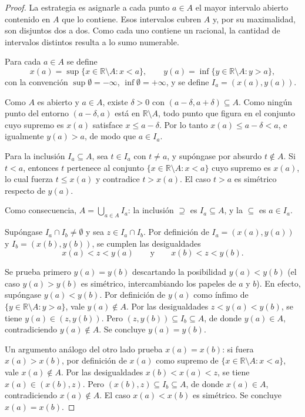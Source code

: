 \documentclass[11pt, a4paper]{article}
\begin{document}
\begin{proof}
La estrategia es asignarle a cada punto $a \in A$ el mayor intervalo abierto contenido en $A$ que
lo contiene. Esos intervalos cubren $A$ y, por su maximalidad, son disjuntos dos a dos. Como cada
uno contiene un racional, la cantidad de intervalos distintos resulta a lo sumo numerable.

Para cada $a \in A$ se define
$$ x(a) = \sup\{x \in \mathbb{R} \setminus A : x < a\}, \qquad y(a) = \inf\{y \in \mathbb{R}
\setminus A : y > a\}, $$
con la convención $\sup \emptyset = -\infty$, $\inf \emptyset = +\infty$, y se define
$I_a = (x(a), y(a))$.

Como $A$ es abierto y $a \in A$, existe $\delta > 0$ con
$(a - \delta, a + \delta) \subseteq A$. Como ningún punto del entorno $(a - \delta, a)$ está en
$\mathbb{R} \setminus A$, todo punto que figura en el conjunto cuyo supremo es $x(a)$ satisface
$x \le a - \delta$. Por lo tanto $x(a) \le a - \delta < a$, e igualmente $y(a) > a$, de modo que
$a \in I_a$.

Para la inclusión $I_a \subseteq A$, sea $t \in I_a$ con $t \ne a$, y supóngase por absurdo
$t \notin A$. Si $t < a$, entonces $t$ pertenece al conjunto $\{x \in \mathbb{R} \setminus A :
x < a\}$ cuyo supremo es $x(a)$, lo cual fuerza $t \le x(a)$ y contradice $t > x(a)$. El caso
$t > a$ es simétrico respecto de $y(a)$.

Como consecuencia, $A = \bigcup_{a \in A} I_a$: la inclusión $\supseteq$ es $I_a \subseteq A$, y
la $\subseteq$ es $a \in I_a$.

Supóngase $I_a \cap I_b \ne \emptyset$ y sea $z \in I_a \cap I_b$. Por definición de
$I_a = (x(a), y(a))$ y $I_b = (x(b), y(b))$, se cumplen las desigualdades
$$ x(a) < z < y(a) \qquad \text{y} \qquad x(b) < z < y(b). $$

Se prueba primero $y(a) = y(b)$ descartando la posibilidad $y(a) < y(b)$ (el caso $y(a) > y(b)$
es simétrico, intercambiando los papeles de $a$ y $b$). En efecto, supóngase $y(a) < y(b)$. Por
definición de $y(a)$ como ínfimo de $\{y \in \mathbb{R} \setminus A : y > a\}$, vale
$y(a) \notin A$. Por las desigualdades $z < y(a) < y(b)$, se tiene $y(a) \in (z, y(b))$. Pero
$(z, y(b)) \subseteq I_b \subseteq A$, de donde $y(a) \in A$, contradiciendo $y(a) \notin A$.
Se concluye $y(a) = y(b)$.

Un argumento análogo del otro lado prueba $x(a) = x(b)$: si fuera $x(a) > x(b)$, por definición
de $x(a)$ como supremo de $\{x \in \mathbb{R} \setminus A : x < a\}$, vale $x(a) \notin A$. Por las
desigualdades $x(b) < x(a) < z$, se tiene $x(a) \in (x(b), z)$. Pero $(x(b), z) \subseteq
I_b \subseteq A$, de donde $x(a) \in A$, contradiciendo $x(a) \notin A$. El caso $x(a) < x(b)$ es
simétrico. Se concluye $x(a) = x(b)$.


\end{proof}
\end{document}
